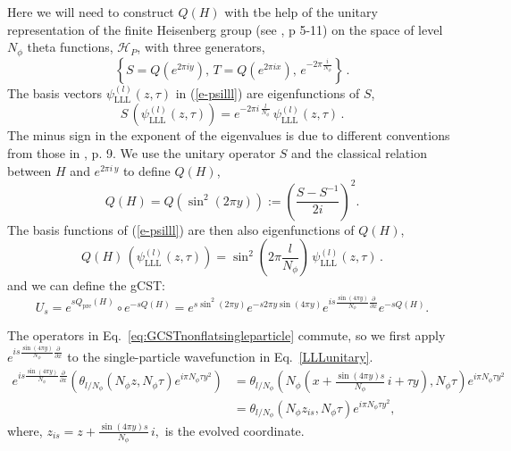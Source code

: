\documentclass[a4paper,11pt]{article}
\begin{document}
Here we will need to construct $Q(H)$
with tbe help of 
 the unitary representation of the finite Heisenberg
group (see \cite{Mumford83}, p 5-11) on the space of level $N_\phi$ theta functions,
$\mathcal{H}_{P}$, with three generators,
$$
\left\{S = Q(e^{2 \pi i y}), \, T = Q(e^{2 \pi i x}), \, e^{-2 \pi \frac{i}{N_\phi}}  \right\}   \, . 
$$
The basis vectors $\psi^{(l)}_{\mathrm{LLL}}(z,\tau)$ in (\ref{e-psilll}) are eigenfunctions of $S$,
$$
S \, (\psi^{(l)}_{\mathrm{LLL}}(z,\tau)) = e^{-2 \pi i \, \frac{l}{N_\phi}} \, \psi^{(l)}_{\mathrm{LLL}}(z,\tau) \, .
$$
The minus sign in the exponent of the eigenvalues is due to different conventions from those in \cite{Mumford83}, p. 9.
We use the unitary operator $S$ and the classical relation between 
$H$ and $e^{2 \pi i \, y}$
to define  $Q(H)$,
\begin{equation}
    Q(H) = Q\left(\sin^2(2\pi y)\right) := \left(\frac{S - S^{-1}}{2i}\right)^2 . 
\label{eq:quantumoperatornonflat}
\end{equation}
The basis functions of (\ref{e-psilll}) are then also eigenfunctions of $Q(H)$,
\begin{equation}
\label{e-eigen-QH}
Q(H) \, (\psi^{(l)}_{\mathrm{LLL}}(z,\tau)) = 
\sin^2(2\pi \frac{l}{N_\phi})
 \, \psi^{(l)}_{\mathrm{LLL}}(z,\tau) \, .
    \end{equation}
and we can define the gCST:
\begin{equation}
   U_{s} = e^{sQ_{\mathrm{pre}}(H)}\circ e^{-sQ(H)} = e^{s\sin^2(2\pi y)}e^{-s 2\pi y\sin(4\pi y)}e^{is\frac{\sin(4\pi y)}{N_{\phi}}\frac{\partial}{\partial x}}e^{-s Q(H)}.  
   \label{eq:GCSTnonflatsingleparticle}
\end{equation}

The operators in Eq.~\eqref{eq:GCSTnonflatsingleparticle} commute, so we first apply $e^{is\frac{\sin(4\pi y)}{N_{\phi}}\frac{\partial}{\partial x}}$ to the single-particle wavefunction in Eq.~\eqref{LLLunitary}. 
\begin{align*}
e^{is\frac{\sin(4\pi y)}{N_{\phi}}\frac{\partial}{\partial x}}(\theta_{l/N_{\phi}}(N_{\phi}z,N_{\phi}\tau)e^{i\pi N_{\phi}\tau y^2}) &=  \theta_{l/N_{\phi}}\left(N_{\phi}\left(x+\frac{\sin(4\pi y)s}{N_{\phi}} \, i +\tau y\right),N_{\phi}\tau\right)e^{i\pi N_{\phi}\tau y^2}\\
&= \theta_{l/N_{\phi}}(N_{\phi}z_{is},N_{\phi}\tau)e^{i\pi N_{\phi}\tau y^2},
\end{align*}
where, $z_{is}=z+\frac{\sin(4\pi y)s}{N_{\phi}} \, i,  $ is the evolved coordinate.
\end{document}
